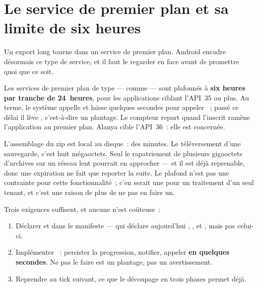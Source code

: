\documentclass[11pt,a4paper,oneside]{report}
\begin{document}
\section{Le service de premier plan et sa limite de six heures}
\label{sec:fgs}

Un export long tourne dans un service de premier plan. Android encadre désormais ce type de
service, et il faut le regarder en face avant de promettre quoi que ce soit.

\begin{constat}
Les services de premier plan de type  --- comme  ---
sont plafonnés à \textbf{six heures par tranche de 24~heures}, pour les applications ciblant
l'API~35 ou plus. Au terme, le système appelle  et laisse quelques
secondes pour appeler ~; passé ce délai il lève
, c'est-à-dire un plantage. Le compteur repart quand l'inscrit
ramène l'application au premier plan. Alanya cible l'API~36~: elle est concernée.
\end{constat}

\begin{note}
L'assemblage du zip est local au disque~: des minutes. Le téléversement d'une sauvegarde,
c'est huit mégaoctets. Seul le rapatriement de plusieurs gigaoctets d'archives sur un réseau
lent pourrait en approcher --- et il est déjà reprenable, donc une expiration ne fait que
reporter la suite. Le plafond n'est pas une contrainte pour cette fonctionnalité~; c'en
serait une pour un traitement d'un seul tenant, et c'est une raison de plus de ne pas en
faire un.
\end{note}

Trois exigences suffisent, et aucune n'est coûteuse~:

\begin{enumerate}[leftmargin=*]
  \item Déclarer  et
         dans le manifeste --- qui déclare
        aujourd'hui , ,  et ,
        mais pas celui-ci.
  \item Implémenter ~: persister la progression, notifier, appeler
         \textbf{en quelques secondes}. Ne pas le faire est un plantage, pas
        un avertissement.
  \item Reprendre au tick suivant, ce que le découpage en trois phases permet déjà.
\end{enumerate}
\end{document}
